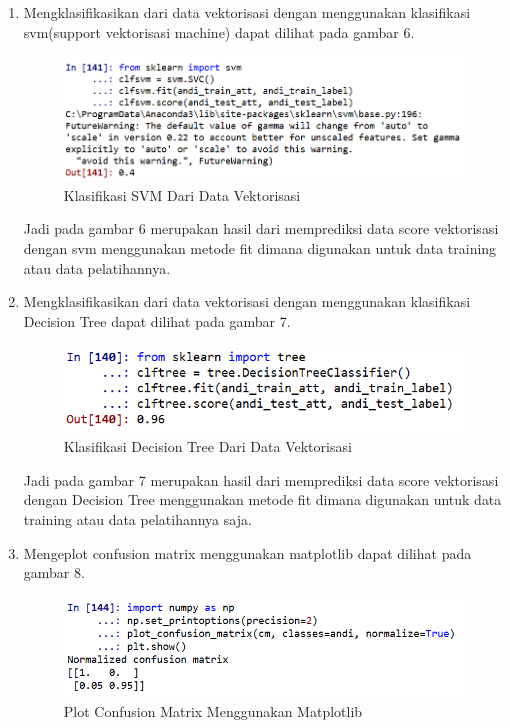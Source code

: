 \begin{enumerate}
\item Mengklasifikasikan dari data vektorisasi dengan menggunakan klasifikasi svm(support vektorisasi machine) dapat dilihat pada  gambar 6.
\begin{figure}[ht]
	\centerline{\includegraphics[width=1\textwidth]{figures/c4P/6.PNG}}
	\caption{Klasifikasi SVM Dari Data Vektorisasi}
	\label{Contoh Ilustrasi}
\end{figure}

\subitem Jadi pada gambar 6 merupakan hasil dari memprediksi data score vektorisasi dengan svm menggunakan metode fit dimana digunakan untuk data training atau data pelatihannya.
\item Mengklasifikasikan dari data vektorisasi dengan menggunakan klasifikasi Decision Tree dapat dilihat pada gambar 7.
\begin{figure}[ht]
	\centerline{\includegraphics[width=1\textwidth]{figures/c4P/7.PNG}}
	\caption{Klasifikasi Decision Tree Dari Data Vektorisasi}
	\label{Contoh Ilustrasi}
\end{figure}

\subitem Jadi pada gambar 7 merupakan hasil dari memprediksi data score vektorisasi dengan Decision Tree menggunakan metode fit dimana digunakan untuk data training atau data pelatihannya saja.
\item Mengeplot confusion matrix menggunakan matplotlib dapat dilihat pada gambar 8.
\begin{figure}[ht]
	\centerline{\includegraphics[width=1\textwidth]{figures/c4P/8.PNG}}
	\caption{Plot Confusion Matrix Menggunakan Matplotlib}
	\label{Contoh Ilustrasi}
\end{figure}


\end{enumerate}
